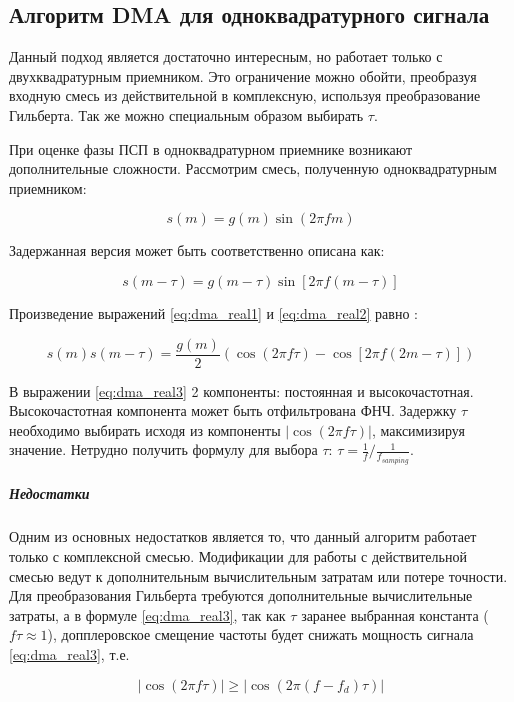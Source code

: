 \subsection{Алгоритм DMA для одноквадратурного сигнала}
\label{sec1:dma_real}

Данный подход является достаточно интересным, но работает только с двухквадратурным приемником. Это ограничение можно
обойти, преобразуя входную смесь из действительной в комплексную, используя преобразование Гильберта.
Так же можно специальным образом выбирать ${\tau}$.

При оценке фазы ПСП в одноквадратурном приемнике возникают дополнительные сложности. Рассмотрим смесь, полученную одноквадратурным приемником:
\begin{center}
\begin{equation}
	\label{eq:dma_real1}
	s(m) = g(m) \sin{(2\pi fm)}
\end{equation}
\end{center}

Задержанная версия может быть соответственно описана как:
\begin{center}
\begin{equation}
	\label{eq:dma_real2}
	s(m - \tau) = g(m - \tau) \sin{\left[2\pi f(m-\tau)\right]}
\end{equation}
\end{center}

Произведение выражений \ref{eq:dma_real1} и \ref{eq:dma_real2} равно \cite{tsui}:
\begin{center}
\begin{equation}
	\label{eq:dma_real3}
	s(m)s(m - \tau) = \frac{g(m)}{2} \left(\cos (2\pi f \tau) - \cos \left[2 \pi f (2m - \tau)\right]\right)
\end{equation}
\end{center}

В выражении \ref{eq:dma_real3} 2 компоненты: постоянная и высокочастотная. Высокочастотная компонента
может быть отфильтрована ФНЧ. Задержку ${\tau}$ необходимо выбирать исходя из компоненты ${\left| \cos (2\pi f \tau) \right|}$,
максимизируя значение. Нетрудно получить формулу для выбора ${\tau}$: ${\tau = \frac{1}{f} / \frac{1}{f_{samping}}}$.

\subparagraph{Недостатки}
Одним из основных недостатков является то, что данный алгоритм работает только с комплексной смесью. Модификации
для работы с действительной смесью ведут к дополнительным вычислительным затратам или потере точности. Для
преобразования Гильберта требуются дополнительные вычислительные затраты, а в формуле \ref{eq:dma_real3}, так
как ${\tau}$ заранее выбранная константа (${f\tau \approx 1}$), допплеровское смещение частоты будет снижать мощность
сигнала \ref{eq:dma_real3}, т.е.
\begin{center}
\begin{equation}
	\left| \cos (2\pi f \tau) \right| \ge \left| \cos (2\pi (f - f_d) \tau) \right|
\end{equation}
\end{center}

